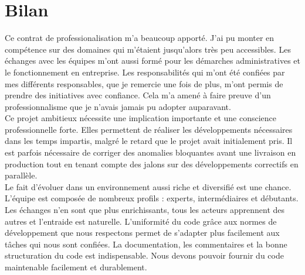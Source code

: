 \documentclass[12pt,a4paper]{article}
\begin{document}
\section{Bilan}
Ce contrat de professionalisation m'a beaucoup apporté. J'ai pu monter en compétence sur des domaines qui m'étaient jusqu'alors très peu accessibles. Les échanges avec les équipes m'ont aussi formé pour les démarches administratives et le fonctionnement en entreprise. Les responsabilités qui m'ont été confiées par mes différents responsables, que je remercie une fois de plus, m'ont permis de prendre des initiatives avec confiance. Cela m'a amené à faire preuve d'un professionnalisme que je n'avais jamais pu adopter auparavant.\\
Ce projet ambitieux nécessite une implication importante et une conscience professionnelle forte. Elles permettent de réaliser les développements nécessaires dans les temps impartis, malgré le retard que le projet avait initialement pris. Il est parfois nécessaire de corriger des anomalies bloquantes avant une livraison en production tout en tenant compte des jalons sur des développements correctifs en parallèle.\\
Le fait d'évoluer dans un environnement aussi riche et diversifié est une chance. L'équipe est composée de nombreux profils : experts, intermédiaires et débutants. Les échanges n'en sont que plus enrichissants, tous les acteurs apprennent des autres et l'entraide est naturelle.
L'uniformité du code grâce aux normes de développement que nous respectons permet de s'adapter plus facilement aux tâches qui nous sont confiées.
La documentation, les commentaires et la bonne structuration du code est indispensable. Nous devons pouvoir fournir du code maintenable facilement et durablement.
\newpage
\clearpage
\end{document}

